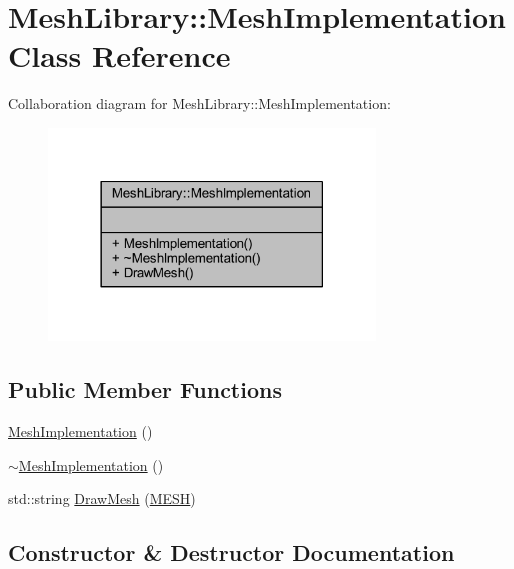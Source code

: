 \hypertarget{class_mesh_library_1_1_mesh_implementation}{}\section{Mesh\+Library\+::Mesh\+Implementation Class Reference}
\label{class_mesh_library_1_1_mesh_implementation}


Collaboration diagram for Mesh\+Library\+::Mesh\+Implementation\+:
\nopagebreak
\begin{figure}[H]
\begin{center}
\leavevmode
\includegraphics[width=246pt]{class_mesh_library_1_1_mesh_implementation__coll__graph}
\end{center}
\end{figure}
\subsection*{Public Member Functions}
\begin{DoxyCompactItemize}
\item 
\mbox{\hyperlink{class_mesh_library_1_1_mesh_implementation_a30bf0486febd128770d515d1d13786c9}{Mesh\+Implementation}} ()
\item 
\mbox{\hyperlink{class_mesh_library_1_1_mesh_implementation_a45b38bb95065ad9ff258d63c60858ca9}{$\sim$\+Mesh\+Implementation}} ()
\item 
std\+::string \mbox{\hyperlink{class_mesh_library_1_1_mesh_implementation_a08e8294ed19a5f1269a73225db7704e5}{Draw\+Mesh}} (\mbox{\hyperlink{_p_i_m_p_l_2_p_i_m_p_l_2_commons_8h_a7d8bc2c54c2771e646f020b8420adafc}{M\+E\+SH}})
\end{DoxyCompactItemize}


\subsection{Constructor \& Destructor Documentation}
\mbox{\label{class_mesh_library_1_1_mesh_implementation_a30bf0486febd128770d515d1d13786c9}} 
